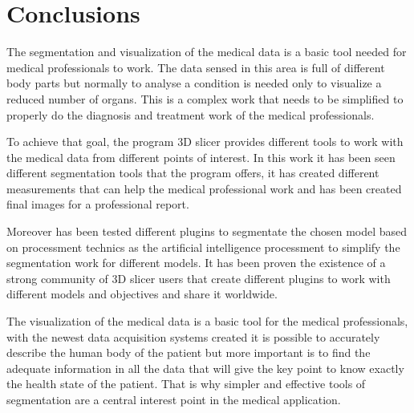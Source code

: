 \section{Conclusions}

The segmentation and visualization of the medical data is a basic tool needed for medical professionals to work. The data sensed in this area is full of different body parts but normally to analyse a condition is needed only to visualize a reduced number of organs. This is a complex work that needs to be simplified to properly do the diagnosis and treatment work of the medical professionals. 

To achieve that goal, the program 3D slicer provides different tools to work with the medical data from different points of interest. In this work it has been seen different segmentation tools that the program offers, it has created different measurements that can help the medical professional work and has been created final images for a professional report.

Moreover has been tested different plugins to segmentate the chosen model based on processment technics as the artificial intelligence processment to simplify the segmentation work for different models. It has been proven the existence of a strong community of 3D slicer users that create different plugins to work with different models and objectives and share it worldwide. 

The visualization of the medical data is a basic tool for the medical professionals, with the newest data acquisition systems created it is possible to accurately describe the human body of the patient but more important is to find the adequate information in all the data that will give the key point to know exactly the health state of the patient. That is why simpler and effective tools of segmentation are a central interest point in the medical application. 